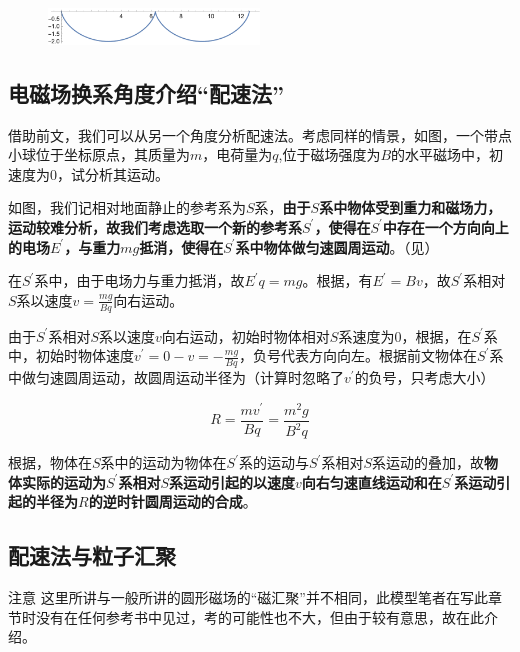 \begin{figure}[htbp]
\centering
\includegraphics[width=0.5\textwidth]{pic_eled/psf_p3.pdf}
\end{figure}

\subsection{电磁场换系角度介绍“配速法”}

借助前文，我们可以从另一个角度分析配速法。考虑同样的情景，如图，一个带点小球位于坐标原点，其质量为$m$，电荷量为$q$,位于磁场强度为$B$的水平磁场中，初速度为$0$，试分析其运动。



如图，我们记相对地面静止的参考系为$S$系，\textbf{由于$S$系中物体受到重力和磁场力，运动较难分析，故我们考虑选取一个新的参考系$S^{\prime}$，使得在$S^{\prime}$中存在一个方向向上的电场$E^{\prime}$，与重力$mg$抵消，使得在$S^{\prime}$系中物体做匀速圆周运动}。（见）

在$S^{\prime}$系中，由于电场力与重力抵消，故$E^{\prime} q = m g$。根据，有$E^{\prime} = B v$，故$S^{\prime}$系相对$S$系以速度$v = \frac{mg}{Bq}$向右运动。

由于$S^{\prime}$系相对$S$系以速度$v$向右运动，初始时物体相对$S$系速度为$0$，根据，在$S^{\prime}$系中，初始时物体速度$v^{\prime} = 0 - v = -\frac{mg}{Bq}$，负号代表方向向左。根据前文物体在$S^{\prime}$系中做匀速圆周运动，故圆周运动半径为（计算时忽略了$v^{\prime}$的负号，只考虑大小）

$$R = \frac{mv^{\prime}}{Bq} = \frac{m^2 g}{B^2 q}$$

根据，物体在$S$系中的运动为物体在$S^{\prime}$系的运动与$S^{\prime}$系相对$S$系运动的叠加，故\textbf{物体实际的运动为$S^{\prime}$系相对$S$系运动引起的以速度$v$向右匀速直线运动和在$S^{\prime}$系运动引起的半径为$R$的逆时针圆周运动的合成}。

\subsection{配速法与粒子汇聚}

\begin{mk}{注意}{}
这里所讲与一般所讲的圆形磁场的“磁汇聚”并不相同，此模型笔者在写此章节时没有在任何参考书中见过，考的可能性也不大，但由于较有意思，故在此介绍。
\end{mk}


